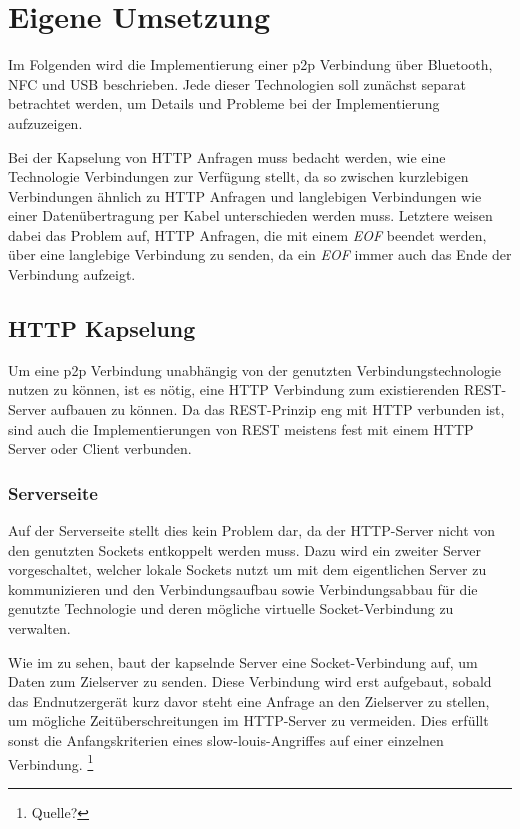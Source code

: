 \section{Eigene Umsetzung}
        Im Folgenden wird die Implementierung einer p2p Verbindung über Bluetooth, NFC und USB beschrieben. Jede dieser Technologien soll zunächst separat betrachtet werden, um Details und Probleme bei der Implementierung aufzuzeigen.
        
        Bei der Kapselung von HTTP Anfragen muss bedacht werden, wie eine Technologie Verbindungen zur Verfügung stellt, da so zwischen kurzlebigen Verbindungen ähnlich zu HTTP Anfragen und langlebigen Verbindungen wie einer Datenübertragung per Kabel unterschieden werden muss. Letztere weisen dabei das Problem auf, HTTP Anfragen, die mit einem {\it EOF} beendet werden, über eine langlebige Verbindung zu senden, da ein {\it EOF} immer auch das Ende der Verbindung aufzeigt.
        
    \subsection{HTTP Kapselung}
        Um eine p2p Verbindung unabhängig von der genutzten Verbindungstechnologie nutzen zu können, ist es nötig, eine HTTP Verbindung zum existierenden REST-Server aufbauen zu können. Da das REST-Prinzip eng mit HTTP verbunden ist, sind auch die Implementierungen von REST meistens fest mit einem HTTP Server oder Client verbunden.
    \subsubsection{Serverseite}        
        Auf der Serverseite stellt dies kein Problem dar, da der HTTP-Server nicht von den genutzten Sockets entkoppelt werden muss. Dazu wird ein zweiter Server vorgeschaltet, welcher lokale Sockets nutzt um mit dem eigentlichen Server zu kommunizieren und den Verbindungsaufbau sowie Verbindungsabbau für die genutzte Technologie und deren mögliche virtuelle Socket-Verbindung zu verwalten.
        
        Wie im  zu sehen, baut der kapselnde Server eine Socket-Verbindung auf, um Daten zum Zielserver zu senden. Diese Verbindung wird erst aufgebaut, sobald das Endnutzergerät kurz davor steht eine Anfrage an den Zielserver zu stellen, um mögliche Zeitüberschreitungen im HTTP-Server zu vermeiden. Dies erfüllt sonst die Anfangskriterien eines slow-louis-Angriffes auf einer einzelnen Verbindung. \footnote{Quelle?}

